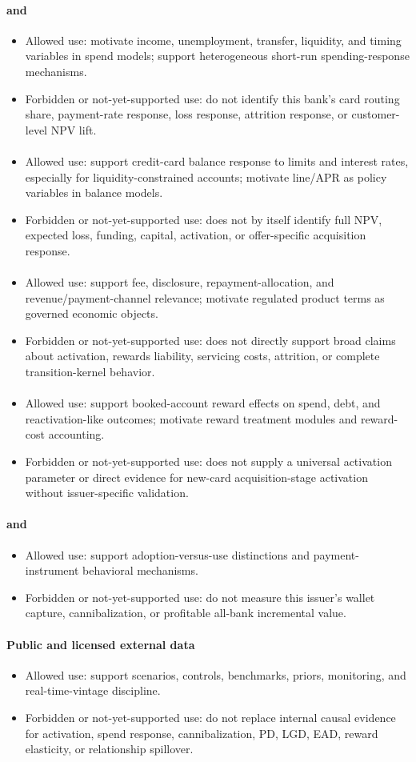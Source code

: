 \documentclass[11pt]{article}
\newcommand{\1}{\mathbf{1}}
\newcommand{\contractitem}[2]{\paragraph{#1}\begin{itemize}[leftmargin=1.5em,itemsep=0.12em,topsep=0.18em]#2\end{itemize}}
\begin{document}
\contractitem{\citet{ganong2019unemployment} and \citet{johnson2004rebates}}{
  \item Allowed use: motivate income, unemployment, transfer, liquidity, and
        timing variables in spend models; support heterogeneous short-run
        spending-response mechanisms.
  \item Forbidden or not-yet-supported use: do not identify this bank's card
        routing share, payment-rate response, loss response, attrition response,
        or customer-level NPV lift.
}
\contractitem{\citet{gross2001liquidity}}{
  \item Allowed use: support credit-card balance response to limits and
        interest rates, especially for liquidity-constrained accounts; motivate
        line/APR as policy variables in balance models.
  \item Forbidden or not-yet-supported use: does not by itself identify full
        NPV, expected loss, funding, capital, activation, or offer-specific
        acquisition response.
}
\contractitem{\citet{agarwal2013cardact}}{
  \item Allowed use: support fee, disclosure, repayment-allocation, and
        revenue/payment-channel relevance; motivate regulated product terms as
        governed economic objects.
  \item Forbidden or not-yet-supported use: does not directly support broad
        claims about activation, rewards liability, servicing costs, attrition,
        or complete transition-kernel behavior.
}
\contractitem{\citet{agarwal2010rewards}}{
  \item Allowed use: support booked-account reward effects on spend, debt, and
        reactivation-like outcomes; motivate reward treatment modules and
        reward-cost accounting.
  \item Forbidden or not-yet-supported use: does not supply a universal
        activation parameter or direct evidence for new-card acquisition-stage
        activation without issuer-specific validation.
}
\contractitem{\citet{koulayev2012payment} and \citet{prelec2001creditcard}}{
  \item Allowed use: support adoption-versus-use distinctions and
        payment-instrument behavioral mechanisms.
  \item Forbidden or not-yet-supported use: do not measure this issuer's wallet
        capture, cannibalization, or profitable all-bank incremental value.
}
\contractitem{Public and licensed external data}{
  \item Allowed use: support scenarios, controls, benchmarks, priors,
        monitoring, and real-time-vintage discipline.
  \item Forbidden or not-yet-supported use: do not replace internal causal
        evidence for activation, spend response, cannibalization, PD, LGD, EAD,
        reward elasticity, or relationship spillover.
}
\end{document}
